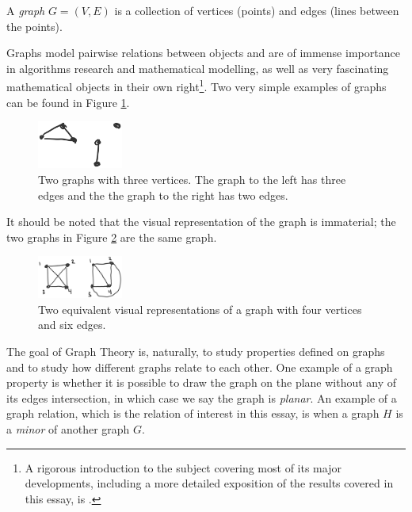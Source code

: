 \begin{definition}[Informal]
A \emph{graph} $G = (V,E)$ is a collection of vertices (points) and edges (lines between the points).
\end{definition}
Graphs model pairwise relations between objects and are of immense importance in algorithms research and mathematical modelling, as well as very fascinating mathematical objects in their own right\footnote{A rigorous introduction to the subject covering most of its major developments, including a more detailed exposition of the results covered in this essay, is \cite{diestelGraphTheory2017}.}. Two very simple examples of graphs can be found in Figure \ref{fig:graphs1}.
\begin{figure}[h!]
  \begin{center}
    \includegraphics[width = 0.25\textwidth]{graf2.png}
  \end{center}
    \caption{Two graphs with three vertices. The graph to the left has three edges and the the graph to the right has two edges.}

  \label{fig:graphs1}
\end{figure}


It should be noted that the visual representation of the graph is immaterial; the two graphs in Figure \ref{fig:graphs2} are the same graph.
\begin{figure}[h!]
  \begin{center}
    \includegraphics[width = 0.25\textwidth]{graf.png}
  \end{center}
    \caption{Two equivalent visual representations of a graph with four vertices and six edges.}

  \label{fig:graphs2}
\end{figure}

The goal of Graph Theory is, naturally, to study properties defined on graphs and to study how different graphs relate to each other. One example of a graph property is whether it is possible to draw the graph on the plane without any of its edges intersection, in which case we say the graph is \emph{planar}. An example of a graph relation, which is the relation of interest in this essay, is when a graph $H$ is a \emph{minor} of another graph $G$.

